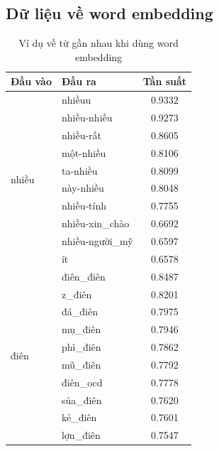 \subsection*{Dữ liệu về word embedding}
\begin{table}[htb]
\centering
\caption{Ví dụ về từ gần nhau khi dùng word embedding}
\label{table:fasttext-mostsimilar}
\begin{tabular}{l l c}
    \toprule
    \textbf{Đầu vào}        & \textbf{Đầu ra} & \textbf{Tần suất}  \\\midrule
    \multirow{10}{*}{nhiều} & nhiềuu          & 0.9332 \\
                            & nhiều-nhiều     & 0.9273 \\
                            & nhiều-rất       & 0.8605 \\
                            & một-nhiều       & 0.8106 \\
                            & ta-nhiều        & 0.8099 \\
                            & này-nhiều       & 0.8048 \\
                            & nhiều-tính      & 0.7755 \\
                            & nhiều-xin\_chào & 0.6692 \\
                            & nhiều-người\_mỹ & 0.6597 \\
                            & ít              & 0.6578 \\\midrule
    \multirow{10}{*}{điên}  & điên\_điên      & 0.8487 \\
                            & z\_điên         & 0.8201 \\
                            & đá\_điên        & 0.7975 \\
                            & mụ\_điên        & 0.7946 \\
                            & phì\_điên       & 0.7862 \\
                            & mũ\_điên        & 0.7792 \\
                            & điên\_ocd       & 0.7778 \\
                            & sủa\_điên       & 0.7620 \\
                            & kẻ\_điên        & 0.7601 \\
                            & lợn\_điên       & 0.7547 \\
    \bottomrule
\end{tabular}
\end{table}

